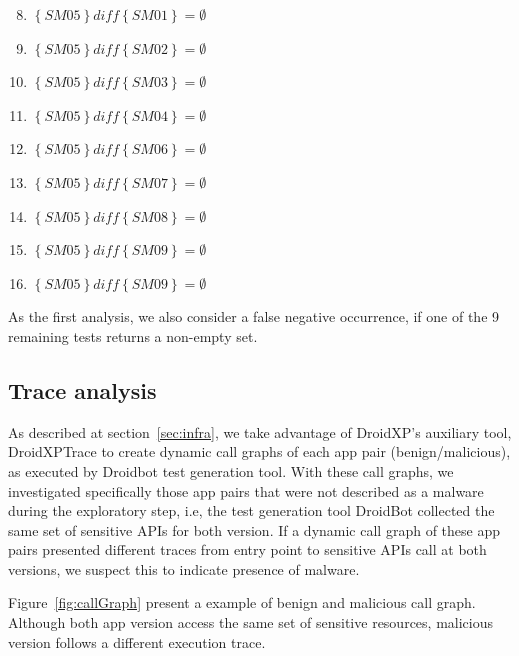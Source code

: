 \begin{enumerate}[(Test 1)] \setcounter{enumi}{7}
 \item {$\left\{SM05\right\} \textit{diff} \left\{SM01\right\} = \emptyset$}
 \item {$\left\{SM05\right\} \textit{diff} \left\{SM02\right\} = \emptyset$}
 \item {$\left\{SM05\right\} \textit{diff} \left\{SM03\right\} = \emptyset$}
 \item {$\left\{SM05\right\} \textit{diff} \left\{SM04\right\} = \emptyset$}
 \item {$\left\{SM05\right\} \textit{diff} \left\{SM06\right\} = \emptyset$}
 \item {$\left\{SM05\right\} \textit{diff} \left\{SM07\right\} = \emptyset$}
 \item {$\left\{SM05\right\} \textit{diff} \left\{SM08\right\} = \emptyset$}
 \item {$\left\{SM05\right\} \textit{diff} \left\{SM09\right\} = \emptyset$}
 \item {$\left\{SM05\right\} \textit{diff} \left\{SM09\right\} = \emptyset$}
\end{enumerate}

As the first analysis, we also consider a false negative occurrence, if one of the 9 remaining tests returns a non-empty set.

\subsection{Trace analysis} \label{sec:pathsetup}

As described at section~\ref{sec:infra}, we take advantage of DroidXP's auxiliary tool, DroidXPTrace to create dynamic call graphs of each app pair (benign/malicious), as executed by Droidbot test generation tool. With these call graphs, we investigated specifically those app pairs that were not described as a malware during the exploratory step, i.e, the test generation tool DroidBot collected the same set of sensitive APIs for both version. If a dynamic call graph of these app pairs presented different traces from entry point to sensitive APIs call at both versions, we suspect this to indicate presence of malware.

Figure~\ref{fig:callGraph} present a example of benign and malicious call graph. Although both app version access the same set of sensitive resources, malicious version follows a different execution trace. 


